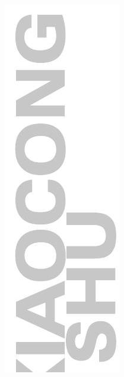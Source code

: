 \documentclass[10pt]{article}
\begin{document}
\includegraphics[max width=\textwidth, center]{2024_10_30_bd799899fef40368a068g-002}
\end{document}
